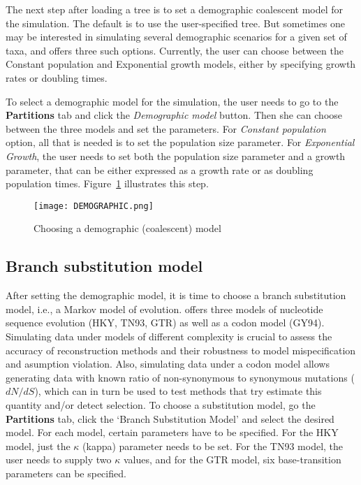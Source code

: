 The next step after loading a tree is to set a demographic coalescent model for the simulation. 
The default is to use the user-specified  tree. But sometimes one may be interested in simulating several demographic scenarios for a given set of taxa, and {\bussname} offers three such options. Currently, the user can choose between the Constant population and Exponential growth models, either by specifying growth rates or doubling times.%

To select a demographic model for the simulation, the user needs to go to the \textbf{Partitions} tab and click  the \emph{Demographic model} button. 
Then she can choose between the three models and set the parameters. 
For \emph{Constant population} option, all that is needed is to set the population size parameter. 
For \emph{Exponential Growth}, the user needs to set both the population size parameter and a growth parameter, that can be either expressed as a growth rate or as doubling population times. 
Figure~\ref{fig:demographic} illustrates this step.

\begin{figure}[H]
\begin{center}
\texttt{[image: DEMOGRAPHIC.png]} 
\end{center}
\caption{Choosing a demographic (coalescent) model}
\label{fig:demographic}
\end{figure}

\subsection{Branch substitution model}

After setting the demographic model, it is time to choose a branch substitution model, i.e., a Markov model of evolution. 
{\bussname} offers three models of nucleotide sequence evolution (HKY, TN93, GTR) as well as a codon model (GY94). 
Simulating data under models of different complexity is crucial to assess the accuracy of reconstruction methods and their robustness to model mispecification and asumption violation. 
Also, simulating data under a codon model allows generating data with known ratio of non-synonymous to synonymous mutations ($dN/dS$), which can in turn be used to test methods that try estimate this quantity and/or detect selection.
To choose a substitution model, go the \textbf{Partitions} tab, click the `Branch Substitution Model' and select the desired model. 
For each model, certain parameters have to be specified. 
For the HKY model, just the $\kappa$ (kappa) parameter needs to be set. 
For the TN93 model, the user needs to supply two $\kappa$ values, and for the GTR model, six base-transition parameters can be specified.

